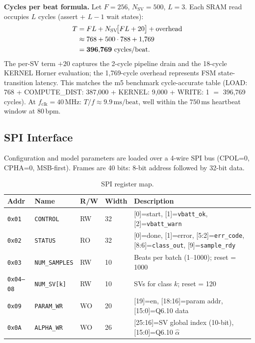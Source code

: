 \documentclass[11pt]{article}
\newcommand{\SV}{N_{\mathrm{SV}}}
\newcommand{\Lat}{L}
\newcommand{\MHz}{\,\mathrm{MHz}}
\begin{document}
\noindent\textbf{Cycles per beat formula.}  Let $F=256$, $\SV=500$, $\Lat=3$.
Each SRAM read occupies $\Lat$ cycles (assert + $\Lat{-}1$ wait states):
\begin{align}
  T &= F\Lat + \SV\!\bigl[F\Lat + 20\bigr] + \text{overhead} \notag\\
    &\approx 768 + 500 \cdot 788 + 1{,}769 \notag\\
    &= \mathbf{396{,}769\text{ cycles/beat}}. \label{eq:cycles}
\end{align}
The per-SV term $+20$ captures the 2-cycle pipeline drain and the 18-cycle
KERNEL Horner evaluation; the 1{,}769-cycle overhead represents FSM
state-transition latency.  This matches the m5 benchmark cycle-accurate table
(LOAD: 768 + COMPUTE\_DIST: 387{,}000 + KERNEL: 9{,}000 + WRITE: 1
$=$ 396{,}769 cycles).
At $f_\text{clk}=40\MHz$: $T/f \approx 9.9\,\mathrm{ms/beat}$,
well within the $750\,\mathrm{ms}$ heartbeat window at 80\,bpm.

\subsection{SPI Interface}

Configuration and model parameters are loaded over a 4-wire SPI bus (CPOL=0,
CPHA=0, MSB-first).  Frames are 40 bits: 8-bit address followed by 32-bit data.

\begin{table}[H]
  \centering
  \caption{SPI register map.}
  \label{tab:regs}
  \small
  \begin{tabular}{llllp{4.5cm}}
    \toprule
    Addr & Name & R/W & Width & Description \\
    \midrule
    \texttt{0x01} & \texttt{CONTROL}    & RW & 32 & [0]=start, [1]=\texttt{vbatt\_ok}, [2]=\texttt{vbatt\_warn} \\
    \texttt{0x02} & \texttt{STATUS}     & RO & 32 & [0]=done, [1]=error, [5:2]=\texttt{err\_code}, [8:6]=\texttt{class\_out}, [9]=\texttt{sample\_rdy} \\
    \texttt{0x03} & \texttt{NUM\_SAMPLES} & RW & 10 & Beats per batch (1--1000); reset = 1000 \\
    \texttt{0x04--08} & \texttt{NUM\_SV[k]} & RW & 10 & SVs for class $k$; reset = 120 \\
    \texttt{0x09} & \texttt{PARAM\_WR}  & WO & 20 & [19]=en, [18:16]=param addr, [15:0]=Q6.10 data \\
    \texttt{0x0A} & \texttt{ALPHA\_WR}  & WO & 26 & [25:16]=SV global index (10-bit), [15:0]=Q6.10 $\hat\alpha$ \\
    \bottomrule
  \end{tabular}
\end{table}
\end{document}
